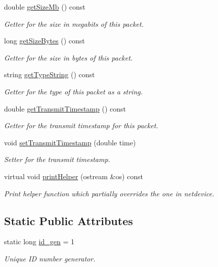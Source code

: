 \begin{DoxyCompactItemize}
double \hyperlink{classpacket_a58e64ca03f52a042dca4268c608ca6b2}{get\-Size\-Mb} () const 
\begin{DoxyCompactList}\small\item\em Getter for the size in megabits of this packet. \end{DoxyCompactList}\item 
long \hyperlink{classpacket_a936359db71dc4a210e5b53d614cf3b79}{get\-Size\-Bytes} () const 
\begin{DoxyCompactList}\small\item\em Getter for the size in bytes of this packet. \end{DoxyCompactList}\item 
string \hyperlink{classpacket_ac5c6ad2cc857a2c93def278a6cb37829}{get\-Type\-String} () const 
\begin{DoxyCompactList}\small\item\em Getter for the type of this packet as a string. \end{DoxyCompactList}\item 
double \hyperlink{classpacket_a6deed8840b2e675824633f123b07734b}{get\-Transmit\-Timestamp} () const 
\begin{DoxyCompactList}\small\item\em Getter for the transmit timestamp for this packet. \end{DoxyCompactList}\item 
void \hyperlink{classpacket_ad9cf233e7dc54745944934d1aa9adf51}{set\-Transmit\-Timestamp} (double time)
\begin{DoxyCompactList}\small\item\em Setter for the transmit timestamp. \end{DoxyCompactList}\item 
virtual void \hyperlink{classpacket_a5f0d34c38a7f075a99cf701c6e9ee5bf}{print\-Helper} (ostream \&os) const 
\begin{DoxyCompactList}\small\item\em Print helper function which partially overrides the one in {\ttfamily netdevice}. \end{DoxyCompactList}\end{DoxyCompactItemize}
\subsection*{Static Public Attributes}
\begin{DoxyCompactItemize}
\item 
static long \hyperlink{classpacket_adc3b99f39d577549ea3701d4b4de2839}{id\-\_\-gen} = 1
\begin{DoxyCompactList}\small\item\em Unique I\-D number generator. \end{DoxyCompactList}\end{DoxyCompactItemize}


